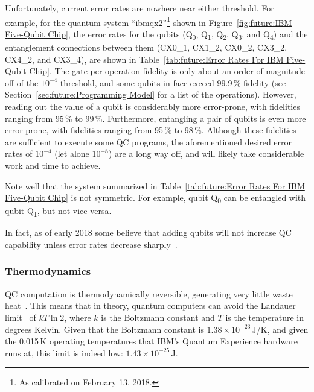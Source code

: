 Unfortunately, current error rates are nowhere near either threshold.
For example, for the quantum system ``ibmqx2''\footnote{
	As calibrated on February 13, 2018.}
shown in
Figure~\ref{fig:future:IBM Five-Qubit Chip},
the error rates for the qubits
(Q\textsubscript{0}, 
Q\textsubscript{1}, 
Q\textsubscript{2}, 
Q\textsubscript{3}, and
Q\textsubscript{4})
and the entanglement connections between them
(CX0\_1,
CX1\_2,
CX0\_2,
CX3\_2,
CX4\_2, and
CX3\_4),
are shown in
Table~\ref{tab:future:Error Rates For IBM Five-Qubit Chip}.
The gate per-operation fidelity is only about an order of magnitude
off of the $10^{-4}$ threshold, and some qubits in face exceed 99.9\,\%
fidelity (see Section~\ref{sec:future:Programming Model} for a list of
the operations).
However, reading out the value of a qubit is considerably more
error-prone, with fidelities ranging from 95\,\% to 99\,\%.
Furthermore, entangling a pair of qubits is even more error-prone,
with fidelities ranging from 95\,\% to 98\,\%.
Although these fidelities are sufficient to execute some QC programs, the
aforementioned desired error rates of $10^{-4}$ (let alone $10^{-8}$) are a
long way off, and will likely take considerable work and time to achieve.

Note well that the system summarized in
Table~\ref{tab:future:Error Rates For IBM Five-Qubit Chip}
is not symmetric.
For example, qubit Q\textsubscript{0} can be entangled with
qubit Q\textsubscript{1}, but not vice versa.

In fact, as of early 2018 some believe that adding qubits will not
increase QC capability unless error rates decrease
sharply~\cite{IBMResearch2018QuantumVolume,TheEconomist2018QualityOverQuantity}.

\subsubsection{Thermodynamics}
\label{sec:future:Thermodynamics}

QC computation is thermodynamically reversible, generating
very little waste heat~\cite{Bennett:1973:LRC:1664562.1664568,RichardFeynman1986QuantumMechanicalComputers}.
This means that in theory, quantum computers can avoid the
Landauer limit~\cite{Landauer:1961:IHG:1661184.1661186}
of $kT \ln 2$, where $k$ is the Boltzmann constant and $T$ is the
temperature in degrees Kelvin.
Given that the Boltzmann constant is $1.38 \times 10^{-23}$\,J/K,
and given the 0.015\,K operating temperatures that IBM's Quantum Experience
hardware runs at, this limit is indeed low: $1.43 \times 10^{-25}$\,J.

